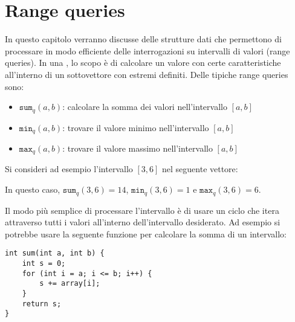 \chapter{Range queries}


In questo capitolo verranno discusse delle strutture 
dati che permettono di processare in modo 
efficiente delle interrogazioni su intervalli di valori
(range queries).
In una ,
lo scopo è di calcolare un valore 
con certe caratteristiche 
all'interno di un sottovettore
con estremi definiti.
Delle tipiche range queries sono:
\begin{itemize}
\item $\texttt{sum}_q(a,b)$: calcolare la somma dei valori nell'intervallo $[a,b]$
\item $\texttt{min}_q(a,b)$: trovare il valore minimo nell'intervallo $[a,b]$
\item $\texttt{max}_q(a,b)$: trovare il valore massimo nell'intervallo $[a,b]$
\end{itemize}

Si consideri ad esempio l'intervallo $[3,6]$ nel seguente vettore:
\begin{center}
\end{center}
In questo caso, $\texttt{sum}_q(3,6)=14$,
$\texttt{min}_q(3,6)=1$ e $\texttt{max}_q(3,6)=6$.

Il modo più semplice di processare l'intervallo è 
di usare un ciclo che itera attraverso tutti i valori 
all'interno dell'intervallo desiderato.
Ad esempio si potrebbe usare la seguente funzione
per calcolare la somma di un intervallo:

\begin{lstlisting}
int sum(int a, int b) {
    int s = 0;
    for (int i = a; i <= b; i++) {
        s += array[i];
    }
    return s;
}
\end{lstlisting}

